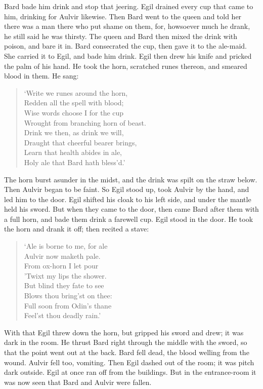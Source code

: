Bard bade him drink and stop that jeering. Egil drained every cup that came to him, drinking for Aulvir likewise. Then Bard went to the queen and told her there was a man there who put shame on them, for, howsoever much he drank, he still said he was thirsty. The queen and Bard then mixed the drink with poison, and bare it in. Bard consecrated the cup, then gave it to the ale-maid. She carried it to Egil, and bade him drink. Egil then drew his knife and pricked the palm of his hand. He took the horn, scratched runes thereon, and smeared blood in them. He sang:

\begin{verse}
`Write we runes around the horn, \\
Redden all the spell with blood; \\
Wise words choose I for the cup \\
Wrought from branching horn of beast. \\
Drink we then, as drink we will, \\
Draught that cheerful bearer brings, \\
Learn that health abides in ale, \\
Holy ale that Bard hath bless'd.' \\
\end{verse}

The horn burst asunder in the midst, and the drink was spilt on the straw below. Then Aulvir began to be faint. So Egil stood up, took Aulvir by the hand, and led him to the door. Egil shifted his cloak to his left side, and under the mantle held his sword. But when they came to the door, then came Bard after them with a full horn, and bade them drink a farewell cup. Egil stood in the door. He took the horn and drank it off; then recited a stave:

\begin{verse}
`Ale is borne to me, for ale \\
Aulvir now maketh pale. \\
From ox-horn I let pour \\
'Twixt my lips the shower. \\
But blind they fate to see \\
Blows thou bring'st on thee: \\
Full soon from Odin's thane \\
Feel'st thou deadly rain.' \\
\end{verse}

With that Egil threw down the horn, but gripped his sword and drew; it was dark in the room. He thrust Bard right through the middle with the sword, so that the point went out at the back. Bard fell dead, the blood welling from the wound. Aulvir fell too, vomiting. Then Egil dashed out of the room; it was pitch dark outside. Egil at once ran off from the buildings. But in the entrance-room it was now seen that Bard and Aulvir were fallen.

